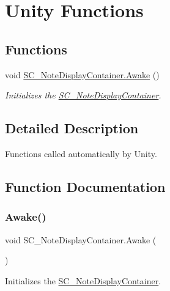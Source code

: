 \hypertarget{group___s_c___n_d_c_unity}{}\section{Unity Functions}
\label{group___s_c___n_d_c_unity}
\subsection*{Functions}
\begin{DoxyCompactItemize}
\item 
void \hyperlink{group___s_c___n_d_c_unity_ga6ce4069508f84edd9e13d8fab4c26e09}{S\+C\+\_\+\+Note\+Display\+Container.\+Awake} ()
\begin{DoxyCompactList}\small\item\em Initializes the \hyperlink{class_s_c___note_display_container}{S\+C\+\_\+\+Note\+Display\+Container}. \end{DoxyCompactList}\end{DoxyCompactItemize}


\subsection{Detailed Description}
Functions called automatically by Unity. 

\subsection{Function Documentation}
\mbox{\label{group___s_c___n_d_c_unity_ga6ce4069508f84edd9e13d8fab4c26e09}} 
\subsubsection{\texorpdfstring{Awake()}{Awake()}}
{\footnotesize\ttfamily void S\+C\+\_\+\+Note\+Display\+Container.\+Awake (\begin{DoxyParamCaption}{ }\end{DoxyParamCaption})\hspace{0.3cm}{\ttfamily [private]}}



Initializes the \hyperlink{class_s_c___note_display_container}{S\+C\+\_\+\+Note\+Display\+Container}. 



